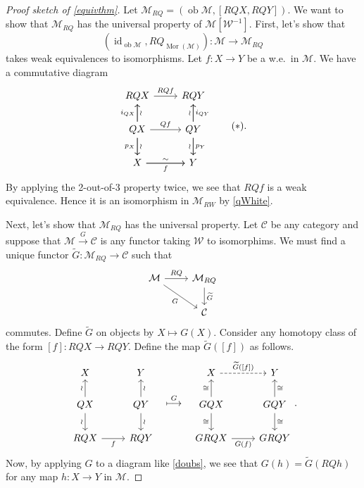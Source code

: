 \documentclass[10pt,letterpaper,cm]{nupset}
\theoremstyle{definition}
\theoremstyle{theorem}
\theoremstyle{remark}
\newcommand{\1}{\mathbb{1}}
\renewcommand{\c}{\mathcal{C}}
\newcommand{\m}{\mathcal{M}}
\newcommand{\w}{\mathscr{W}}
\newcommand{\0}{\vec 0}
\DeclareMathOperator{\id}{id}
\DeclareMathOperator{\ob}{ob}
\DeclareMathOperator{\mor}{Mor}
\begin{document}
\smallskip

\begin{proof}[Proof sketch of \cref{equivthm}]
Let $\m_{RQ} =  \left(\ob{\m},  \left[RQ{X}, RQ{Y}\right]\right)$. We want to show that $\m_{RQ}$ has the universal property of $\m\left[\w^{-1}\right]$. First, let's show that 
\[
\left(\id_{\ob{\m}}, RQ_{\mor(\m)}\right) : \m \longrightarrow \m_{RQ}
\] takes weak equivalences to isomorphisms. Let $f: X \to Y$ be a w.e.\ in $\m$. We have a commutative diagram
\[ \label{doubs}
\begin{tikzcd}
	{RQ{X}} & {RQ{Y}} \\
	{Q{X}} & {Q{Y}} \\
	X & Y
	\arrow["{Q{f}}", from=2-1, to=2-2]
	\arrow["f"', from=3-1, to=3-2]
	\arrow["{p_X}"', from=2-1, to=3-1]
	\arrow["{p_Y}", from=2-2, to=3-2]
	\arrow["{RQ{f}}", from=1-1, to=1-2]
	\arrow["{i_{QX}}", from=2-1, to=1-1]
	\arrow["{i_{Q{Y}}}"', from=2-2, to=1-2]
	\arrow["\wr"', from=2-2, to=3-2]
	\arrow["\wr", from=2-1, to=3-1]
	\arrow["\sim", from=3-1, to=3-2]
	\arrow["\wr"', from=2-1, to=1-1]
	\arrow["\wr", from=2-2, to=1-2]
\end{tikzcd} \tag{$\ast$}
.\] By applying the 2-out-of-3 property twice, we see that $RQ{f}$ is a weak equivalence. Hence it is an isomorphism in $\m_{RW}$ by  \cref{qWhite}.

\medskip

Next, let's show that $\m_{RQ}$ has the universal property. Let $\c$ be any category and suppose that $\m \xrightarrow{G} \c$ is any functor taking $\w$ to isomorphims. We must find a unique functor $\widetilde{G} : \m_{RQ} \to \c$ such that 
\[
\begin{tikzcd}
	\m & {\m_{RQ}} \\
	& \c
	\arrow["G"', from=1-1, to=2-2]
	\arrow["RQ", from=1-1, to=1-2]
	\arrow["{\widetilde{G}}", from=1-2, to=2-2]
\end{tikzcd}
\]  commutes. Define $\widetilde{G}$ on objects by $X \mapsto G(X)$.   Consider any homotopy class of the form $\left[f\right] : RQ{X} \to RQ{Y}$. Define the map $\widetilde{G}(\left[f\right])$ as follows.
\[
\begin{tikzcd}
	X & Y \\
	{Q{X}} & {Q{Y}} \\
	{RQ{X}} & {RQ{Y}}
	\arrow["\wr", from=2-1, to=1-1]
	\arrow["\wr"', from=2-1, to=3-1]
	\arrow["f"', from=3-1, to=3-2]
	\arrow["\wr", from=2-2, to=3-2]
	\arrow["\wr"', from=2-2, to=1-2]
\end{tikzcd}
\ \ \overset{G}{\longmapsto}  \ \
\begin{tikzcd}
	X & Y \\
	{GQ{X}} & {GQ{Y}} \\
	{GRQ{X}} & {GRQ{Y}}
	\arrow["\cong", from=2-1, to=1-1]
	\arrow["\cong"', from=2-1, to=3-1]
	\arrow["{G(f)}"', from=3-1, to=3-2]
	\arrow["\cong", from=2-2, to=3-2]
	\arrow["\cong"', from=2-2, to=1-2]
	\arrow["{\widetilde{G}(\left[f\right])}", dashed, from=1-1, to=1-2]
\end{tikzcd}
.\]
Now, by applying $G$ to a diagram like \eqref{doubs}, we see that $G(h) = \widetilde{G}(RQ{h})$ for any map $h : X \to Y$ in $\m$.


\end{proof}
\end{document}
